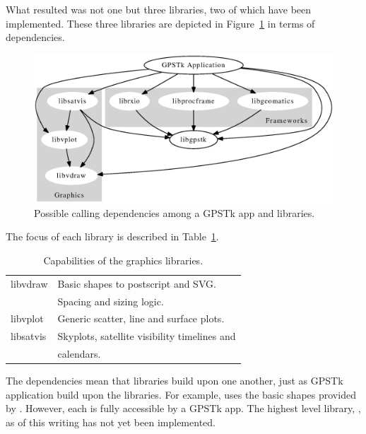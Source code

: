 What resulted was not one but three libraries, two of which have been
implemented. These three libraries are depicted in
Figure~\ref{fig:deps} in terms of dependencies.
%
\begin{figure}
  \centering
  \includegraphics[width=4.5in,bb=35 37 647 349]{deps.eps}
  \caption{Possible calling dependencies among a GPSTk app and libraries.}
  \label{fig:deps}
\end{figure}
%
The focus of each library is described in Table~\ref{table:graphiclibs}.
%
\begin{table}[h]
\centering
\caption{Capabilities of the graphics libraries.}
\label{table:graphiclibs}
\begin{tabular}{ll} \hline \hline
libvdraw & Basic shapes to postscript and SVG. \\
 & Spacing and sizing logic. \\ \hline
libvplot & Generic scatter, line and surface plots. \\ \hline
libsatvis & Skyplots, satellite visibility timelines and \\ 
          & calendars. \\ \hline \hline
\end{tabular}
\end{table}
%
The dependencies mean that libraries build upon one another, just as
GPSTk application build upon the libraries. For example,
 uses the basic shapes provided by
. However, each is fully accessible by a GPSTk
app. The highest level library, , as of this
writing has not yet been implemented.

